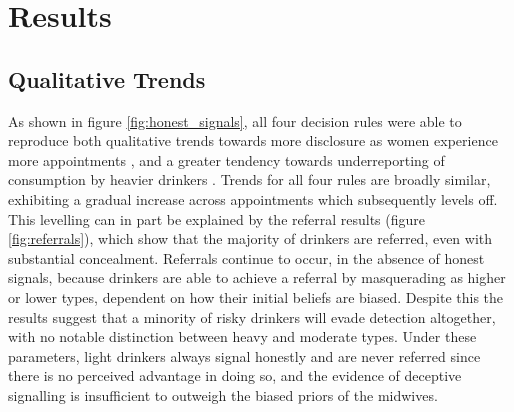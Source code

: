 \section{Results}
\label{sec:results}


\subsection{Qualitative Trends}
\label{sub:qt_results}

As shown in figure \ref{fig:honest_signals}, all four decision rules were able to reproduce both qualitative trends towards more disclosure as women experience more appointments \citep{Phillips2007}, and a greater tendency towards underreporting of consumption by heavier drinkers \citep{Alvik2006}.  Trends for all four rules are broadly similar, exhibiting a gradual increase across appointments which subsequently levels off. This levelling can in part be explained by the referral results (figure \ref{fig:referrals}), which show that the majority of drinkers are referred, even with substantial concealment. Referrals continue to occur, in the absence of honest signals, because drinkers are able to achieve a referral by masquerading as higher or lower types, dependent on how their initial beliefs are biased. Despite this the results suggest that a minority of risky drinkers will evade detection altogether, with no notable distinction between heavy and moderate types. Under these parameters, light drinkers always signal honestly and are never referred since there is no perceived advantage in doing so, and the evidence of deceptive signalling is insufficient to outweigh the biased priors of the midwives. 

